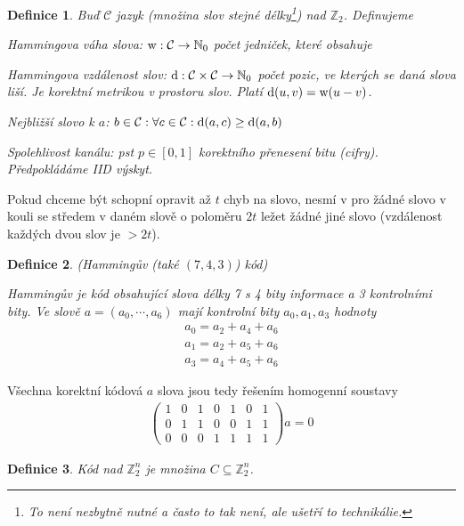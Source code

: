 \documentclass[a4paper,10pt,titlepage]{article} \usepackage[utf8]{inputenc}
\newtheorem{define}{Definice}
\begin{document}
\begin{define}
Buď $\mathcal{C}$ jazyk (množina slov stejné délky\footnote{To není nezbytně nutné a často to tak není, ale ušetří to technikálie.}) nad $\mathbb{Z}_2$. Definujeme

Hammingova váha slova: $\textup{w}: \mathcal{C} \rightarrow \mathbb{N}_0$ počet jedniček, které obsahuje

Hammingova vzdálenost slov: $\textup{d}: \mathcal{C}\times\mathcal{C} \rightarrow \mathbb{N}_0$ počet pozic, ve kterých se daná slova liší. Je korektní metrikou v prostoru slov. Platí $\textup{d}(u, v) = \textup{w}(u - v)$.

Nejbližší slovo k $a$: $b \in \mathcal{C}: \forall c \in \mathcal{C}: \textup{d}(a, c) \geq \textup{d}(a, b)$

Spolehlivost kanálu: pst $p \in [0,1]$ korektního přenesení bitu (cifry). Předpokládáme IID výskyt.
\end{define}

Pokud chceme být schopní opravit až $t$ chyb na slovo, nesmí v pro žádné slovo v kouli se středem v daném slově o poloměru $2t$ ležet žádné jiné slovo (vzdálenost každých dvou slov je $> 2t$).


\begin{define}
(Hammingův (také $(7, 4, 3)$) kód)

Hammingův je kód obsahující slova délky 7 s 4 bity informace a 3 kontrolními bity. Ve slově $a = (a_0, \cdots, a_6)$ mají kontrolní bity $a_0, a_1, a_3$ hodnoty
\begin{align*}
a_0 = a_2 + a_4 + a_6 \\
a_1 = a_2 + a_5 + a_6 \\
a_3 = a_4 + a_5 + a_6
\end{align*}
\end{define}

Všechna korektní kódová $a$ slova jsou tedy řešením homogenní soustavy
\begin{align*}
\begin{pmatrix}
1  & 0   & 1 &  0 &  1 &  0 &  1 \\
0  & 1  & 1  & 0  & 0  & 1  & 1 \\
0  & 0 &  0  & 1  & 1  & 1  & 1
\end{pmatrix}a=0
\end{align*}

\begin{define}
Kód nad $\mathbb{Z}^n_2$ je množina $C \subseteq \mathbb{Z}^n_2$.
\end{define}
\end{document}
